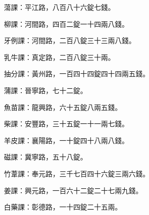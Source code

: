 \begin{pinyinscope}
 蕩課：平江路，八百八十六錠七錢。



 柳課：河間路，四百二錠一十四兩八錢。



 牙例課：河間路，二百八錠三十三兩八錢。



 乳牛課：真定路，二百八錠三十兩。



 抽分課：黃州路，一百四十四錠四十四兩五錢。



 蒲課：晉寧路，七十二錠。



 魚苗課：龍興路，六十五錠八兩五錢。



 柴課：安豐路，三十五錠一十一兩七錢。



 羊皮課：襄陽路，一十錠四十八兩八錢。



 磁課：冀寧路，五十八錠。



 竹葦課：奉元路，三千七百四十六錠三兩六錢。



 姜課：興元路，一百六十二錠二十七兩九錢。



 白藥課：彰德路，一十四錠二十五兩。



\end{pinyinscope}